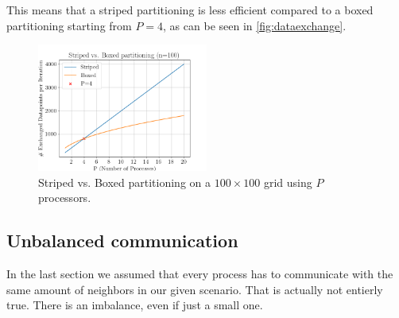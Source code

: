 This means that a striped partitioning is less efficient compared to a boxed partitioning starting from $P=4$, as can be seen in \autoref{fig:dataexchange}.\\
\begin{figure}[H]
    \centering
    \includegraphics[width=0.5\textwidth]{../fig/lab2/scale23.png}
    \caption{Striped vs. Boxed partitioning on a $100\times100$ grid using $P$ processors.}
    \label{fig:dataexchange}
\end{figure}
\subsection{Unbalanced communication}
In the last section we assumed that every process has to communicate with the same amount of neighbors in our given scenario. That is actually not entierly true. There is an imbalance, even if just a small one.\\ 

